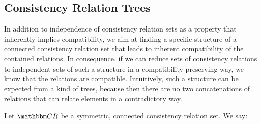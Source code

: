 \subsection{Consistency Relation Trees}

In addition to independence of consistency relation sets as a property that inherently implies compatibility, we aim at finding a specific structure of a connected consistency relation set that leads to inherent compatibility of the contained relations.
In consequence, if we can reduce sets of consistency relations to independent sets of such a structure in a compatibility-preserving way, we know that the relations are compatible.
Intuitively, such a structure can be expected from a kind of trees, because then there are no two concatenations of relations that can relate elements in a contradictory way.

\begin{definition} \label{def:relationtree}
    Let $\consistencyrelationset{CR}$ be a symmetric, connected consistency relation set. 
    We say:
\end{definition}

